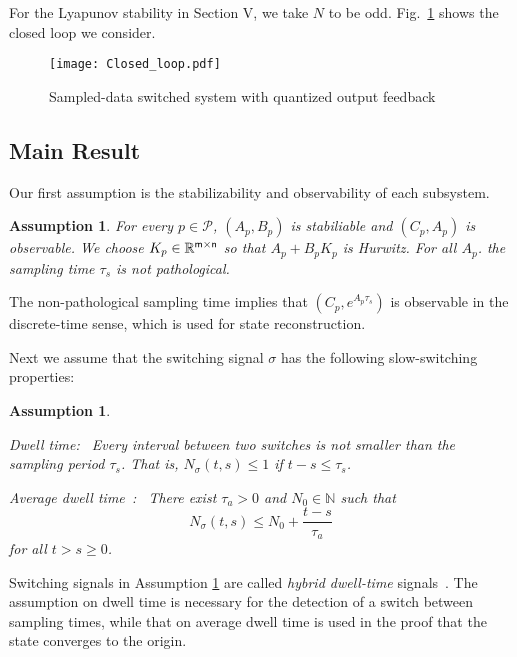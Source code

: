 \documentclass[letterpaper, 11pt, onecolumn]{ieeeconf}  \IEEEoverridecommandlockouts
\newtheorem{assumption}[theorem]{Assumption}
\begin{document}
For the Lyapunov stability in Section V, we take $N$ to be odd.
Fig.~\ref{fig:SSSQOF} shows the closed loop we consider.
 \begin{figure}[tb]
 \centering
 \texttt{[image: Closed\_loop.pdf]}
 \caption{Sampled-data switched system with quantized output feedback}
 \label{fig:SSSQOF}
 \end{figure}


\subsection{Main Result}
Our first assumption is the stabilizability and observability of each subsystem.
\begin{assumption}
\label{ass:system}
{\em
For every $p \in \mathcal{P}$, $(A_p, B_p)$ is stabiliable and
$(C_p, A_p)$
is observable.
We choose $K_p \in \mathbb{R}^{\sf m \times n}$ so that
$A_p+B_pK_p$ is Hurwitz.
For all $A_p$. 
the sampling time $\tau_s$ is not pathological.
}
\end{assumption}
The non-pathological sampling time implies that
$(C_p, e^{A_p\tau_s})$ is observable in the discrete-time sense,
which is used for state reconstruction.


Next we assume that the switching signal $\sigma$ has
the following slow-switching properties:
\begin{assumption}
\label{ass:switching_time}
{\em
{\sl Dwell time:~}
Every interval between two switches is not smaller than
the sampling period $\tau_s$. That is, 
$N_{\sigma}(t,s) \leq 1$ if $t-s \leq \tau_s$.

{\sl Average dwell time~\cite{Hespanha1999CDC}:~}
There exist $\tau_a>0$ and $N_0 \in \mathbb{N}$ such that
\begin{equation}
\label{eq:ADT_cond}
N_{\sigma}(t,s) \leq N_0 + \frac{t-s}{\tau_a}
\end{equation}
for all $t > s \geq 0$.
}
\end{assumption}

Switching signals in
Assumption \ref{ass:switching_time} are called 
{\em hybrid dwell-time} signals~\cite{Vu2011, Liberzon2014}.
The assumption on dwell time is necessary for the
detection of a switch between sampling times,
while that on average dwell time is used in the proof that the state
converges to the origin.
\end{document}
